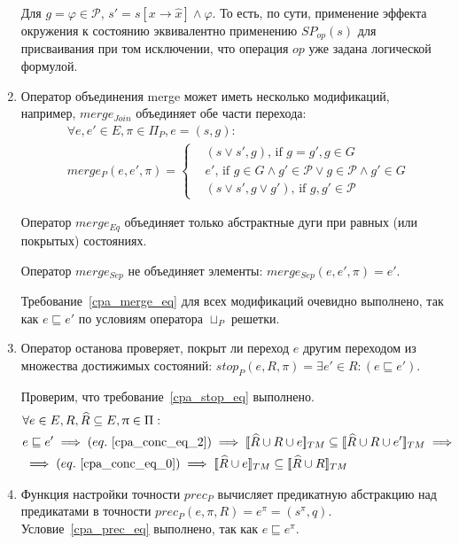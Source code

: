 \begin{enumerate}
Для $g = \varphi \in \mathscr{P}$, $s' = s[x \rightarrow \hat x] \land \varphi$.
То есть, по сути, применение эффекта окружения к состоянию эквивалентно применению $SP_{op}(s)$ для присваивания при том исключении, что операция $op$ уже задана логической формулой.

\item 
Оператор объединения merge может иметь несколько модификаций, например,
$merge_{Join}$ объединяет обе части перехода:
\begin{equation}
\label{predicate_merge_join_def}
\begin{aligned}
& \forall e, e' \in E, \pi \in \Pi_P, e =(s,g): \\
& merge_{P}(e, e', \pi) = 
\begin{cases}
& (s \lor s', g) \text{, if } g = g', g \in G \\
& e' \text{, if } g \in G \land g' \in \mathscr{P} \lor g \in \mathscr{P} \land g' \in G \\
& (s \lor s', g \lor g') \text{, if } g, g' \in \mathscr{P}
\end{cases}
\end{aligned}
\end{equation}

Оператор $merge_{Eq}$ объединяет только абстрактные дуги при равных (или покрытых) состояниях.

Оператор $merge_{Sep}$ не объединяет элементы: $merge_{Sep}(e, e', \pi) = e'$.

Требование~\ref{cpa_merge_eq} для всех модификаций очевидно выполнено, так как $e \sqsubseteq e'$  по условиям оператора $\sqcup_P$ решетки.

\item Оператор останова проверяет, покрыт ли переход $e$ другим переходом из множества достижимых состояний: $stop_{P}(e, R, \pi) = \exists e'\in R: (e \sqsubseteq e')$.

Проверим, что требование~\ref{cpa_stop_eq} выполнено.
\begin{align*}
&\forall e \in E, R, \widehat{R} \subseteq E, \pi \in \Pi: \\
& e \sqsubseteq e' \implies (eq.~\ref{cpa_conc_eq_2}) \implies \conctm{\widehat{R} \cup R \cup e} \subseteq \conctm{\widehat{R} \cup R \cup e'} \implies  \\
& \implies (eq.~\ref{cpa_conc_eq_0}) \implies \conctm{\widehat{R} \cup e} \subseteq \conctm{\widehat{R} \cup R} 
\end{align*}

\item Функция настройки точности $prec_P$ вычисляет предикатную абстракцию над предикатами в точности $prec_{P}(e, \pi, R) = e^{\pi} = (s^{\pi}, q)$.
Условие~\ref{cpa_prec_eq} выполнено, так как $e \sqsubseteq e^{\pi}$.


\end{enumerate}
